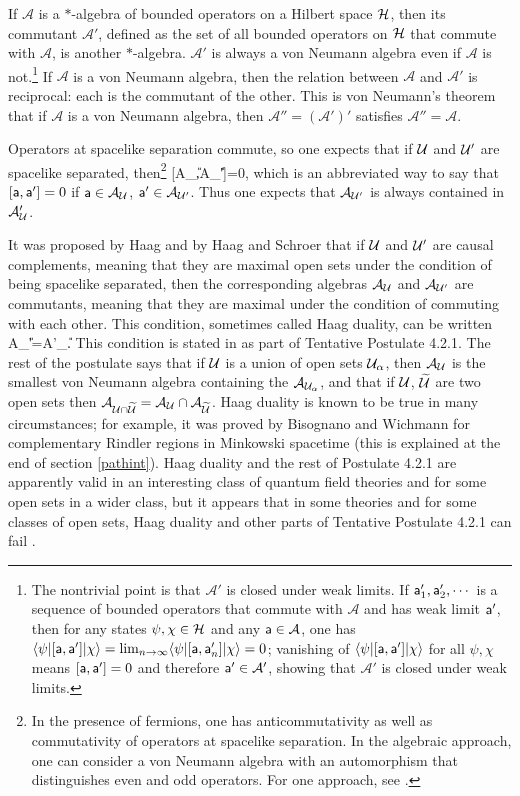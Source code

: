 \documentclass[12pt]{article}
\def\a{{\sf a}}
\def\ra{\rangle}
\def\la{\langle}
\numberwithin{equation}{section}
\def\A{{\mathcal A}}
\begin{document}
If $\A$ is a $*$-algebra of bounded operators on a Hilbert space ${\mathcal H}$, then its commutant $\A'$, defined as 
the set of all bounded operators on ${\mathcal H}$  that commute
with $\A$,   is another $*$-algebra.
   $\A'$ is always a von Neumann algebra
even if $\A$ is not.\footnote{\label{later}The nontrivial point is that $\A'$ is closed under weak limits.
 If $\a_1',\a_2',\cdots$ is a sequence of bounded operators that commute with $\A$ and 
has weak limit $\a'$, then for any states $\psi,\chi\in{\mathcal H}$ and any $\a\in \A$, one has $\la\psi|[\a,\a']|\chi\ra=\lim_{n\to\infty}\la\psi|[\a,\a'_n]|\chi\ra
=0$; vanishing of $\la\psi|[\a,\a']|\chi\ra$ for all $\psi,\chi$ means $[\a,\a']=0$ and therefore $\a'\in\A'$, showing that $\A'$ is closed
under weak limits.}  If $\A$ is a von Neumann algebra, then the relation
between $\A$ and $\A'$ is reciprocal: each is the commutant of the other.    This is von Neumann's theorem that if $\A$ is a von Neumann
algebra, then $\A''=(\A')'$ satisfies $\A''=\A$.


Operators at spacelike
separation commute, so one expects that if ${\mathcal U}$ and ${\mathcal U}'$ are spacelike separated, then\footnote{In the presence of fermions,
one has anticommutativity as well as commutativity of operators at spacelike separation.  In the algebraic approach, one can consider
a von Neumann algebra with an automorphism that distinguishes even and odd operators.  For one approach, see \cite{GL}.}
\be\label{motto} [\A_\U,\A_{\U'}]=0,\ee
which is an abbreviated way to say that $[\a,\a']=0$ if $\a\in\A_\U$, $\a'\in\A_{\U'}$. 
Thus one expects that $\A_{\U'}$ is always contained in $\A_\U'$.  

It was proposed by Haag \cite{HG} and by Haag and Schroer \cite{HS} that if ${\mathcal U}$ and ${\mathcal U}'$ are causal complements, meaning that they are
maximal open sets under the condition of being spacelike separated, then the corresponding algebras $\A_\U$ and $\A_{\U'}$
are commutants, meaning that they are maximal under the condition of commuting with each other.  This condition,  sometimes
called Haag duality,  can be written
\be\label{poffo} \A_{\U'}=\A'_\U.  \ee
 This condition is stated in
\cite{Haag} as part of Tentative Postulate 4.2.1.   The rest of the postulate says that if ${\mathcal U}$ is a union of open sets ${\mathcal U}_\alpha$,
then $\A_\U$ is the smallest von Neumann algebra containing the $\A_{\U_\alpha}$, and that if ${\mathcal U}$, $\t\U$ are two open sets
then $\A_{\U\cap\t\U}=\A_\U\cap \A_{\t\U}$.    Haag duality is known to be true in many circumstances; for example, it
was proved by Bisognano and Wichmann \cite{BiWi}  for complementary Rindler regions in Minkowski spacetime (this is explained at the
end of section \ref{pathint}).  Haag duality and the rest of Postulate 4.2.1 are apparently valid in an interesting class of quantum
field theories and for some open sets in a wider class, but it  appears that 
in some theories and for some classes of open sets,  Haag duality and other
parts of Tentative Postulate 4.2.1 can fail
\cite{LRT,DL,SchroerP, HO}.
\end{document}
